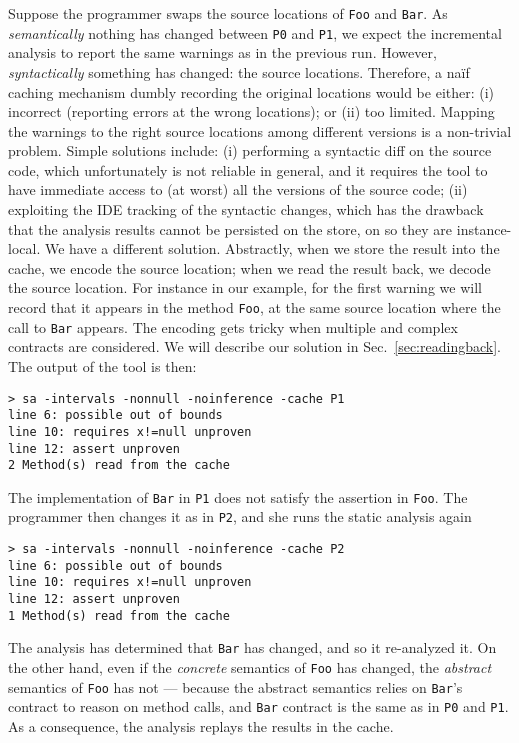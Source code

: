 \documentclass{llncs}
\newcommand{\code}[1]{\lstinline{#1}}
\begin{document}
Suppose the programmer swaps the source locations of \code{Foo} and \code{Bar}. 
As \emph{semantically} nothing has changed between \code{P0} and \code{P1}, we expect the incremental analysis to report the same warnings as in the previous run.
However, \emph{syntactically} something has changed: the source locations. 
Therefore, a na\"if caching mechanism dumbly recording the original locations would be either: (i) incorrect (reporting errors at the wrong locations); or (ii) too limited.
Mapping the warnings to the right source locations among different versions is a non-trivial problem.
Simple solutions include: (i) performing a syntactic diff on the source code, which unfortunately is not reliable in general, and it requires the tool to have immediate access to (at worst) all the versions of the source code; 
(ii) exploiting the IDE tracking of the syntactic changes, which has the drawback that the analysis results cannot be persisted on the store, on so they are instance-local.
We have a different solution.
Abstractly, when we store the result into the cache, we encode the source location; when we read the result back, we decode the source location.
For instance in our example, for the first warning we will record that it appears in the method \code{Foo}, at the same source location where the call to \code{Bar} appears. 
The encoding gets tricky when multiple and complex contracts are considered.
We will describe our solution in Sec.~\ref{sec:readingback}.
The output of the tool is then:
\begin{lstlisting}
> sa -intervals -nonnull -noinference -cache P1 
line 6: possible out of bounds
line 10: requires x!=null unproven
line 12: assert unproven
2 Method(s) read from the cache
\end{lstlisting}

The implementation of \code{Bar} in \code{P1} does not satisfy the assertion in \code{Foo}.
The programmer then changes it as in \code{P2}, and she runs the static analysis again
\begin{lstlisting}
> sa -intervals -nonnull -noinference -cache P2 
line 6: possible out of bounds
line 10: requires x!=null unproven
line 12: assert unproven
1 Method(s) read from the cache
\end{lstlisting}
The analysis has determined that \code{Bar} has changed, and so it re-analyzed it.
On the other hand, even if the \emph{concrete} semantics of \code{Foo} has changed, the \emph{abstract} semantics of \code{Foo} has not --- because the abstract semantics relies on \code{Bar}'s contract to reason on method calls, and \code{Bar} contract is the same as in \code{P0} and \code{P1}.
As a consequence, the analysis replays the results in the cache.
\end{document}
